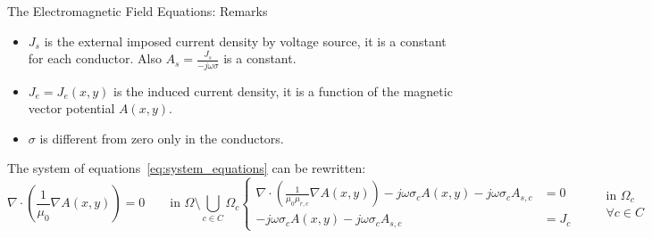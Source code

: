 \documentclass[aspectratio=54,xcolor=dvipsnames]{beamer}
\begin{document}
\begin{frame}{The Electromagnetic Field Equations: Remarks}
    \small
    \begin{itemize}[]
        \item $J_s$ is the external imposed current density by voltage source, it is a constant for each conductor. Also $A_s = \frac{J_s}{- j \omega \sigma}$ is a constant.
        \item $J_e = J_e(x,y)$ is the induced current density, it is a function of the magnetic vector potential $A(x,y)$.
        \item $\sigma$ is different from zero only in the conductors.  
    \end{itemize}
    The system of equations~\eqref{eq:system_equations} can be rewritten:
    \begin{subequations}
    \begin{equation*}
        \nabla \cdot \left( \frac{1}{\mu_0} \nabla A(x,y) \right)  = 0 \quad \quad \text{in } \Omega \setminus \bigcup_{c \in C} \Omega_c
    \end{equation*}
    \begin{equation*}
        \left\{
        \begin{aligned}
        \nabla \cdot \left( \frac{1}{\mu_0\mu_{r,c}} \nabla A(x,y) \right) - j\omega \sigma_c A(x,y) - j\omega \sigma_c A_{s,c} &= 0 
        \\[1em]
        - j\omega \sigma_c A(x,y) - j\omega \sigma_c A_{s,c} &= J_c 
        \end{aligned}
        \right.
        \qquad             
        \begin{array}{l}
            \text{in } \Omega_c \\
            \forall c \in C
        \end{array}
    \end{equation*}
    \end{subequations}

\end{frame}
\end{document}
